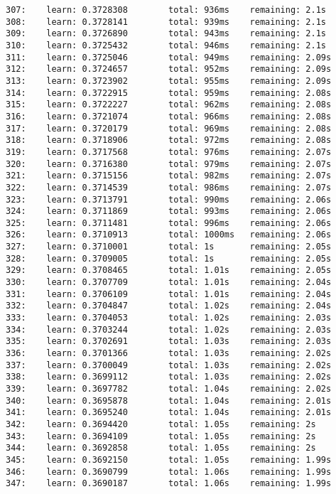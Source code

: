 \documentclass[11pt]{article}
\begin{document}
\begin{Verbatim}[commandchars=\\\{\}]
307:    learn: 0.3728308        total: 936ms    remaining: 2.1s
308:    learn: 0.3728141        total: 939ms    remaining: 2.1s
309:    learn: 0.3726890        total: 943ms    remaining: 2.1s
310:    learn: 0.3725432        total: 946ms    remaining: 2.1s
311:    learn: 0.3725046        total: 949ms    remaining: 2.09s
312:    learn: 0.3724657        total: 952ms    remaining: 2.09s
313:    learn: 0.3723902        total: 955ms    remaining: 2.09s
314:    learn: 0.3722915        total: 959ms    remaining: 2.08s
315:    learn: 0.3722227        total: 962ms    remaining: 2.08s
316:    learn: 0.3721074        total: 966ms    remaining: 2.08s
317:    learn: 0.3720179        total: 969ms    remaining: 2.08s
318:    learn: 0.3718906        total: 972ms    remaining: 2.08s
319:    learn: 0.3717568        total: 976ms    remaining: 2.07s
320:    learn: 0.3716380        total: 979ms    remaining: 2.07s
321:    learn: 0.3715156        total: 982ms    remaining: 2.07s
322:    learn: 0.3714539        total: 986ms    remaining: 2.07s
323:    learn: 0.3713791        total: 990ms    remaining: 2.06s
324:    learn: 0.3711869        total: 993ms    remaining: 2.06s
325:    learn: 0.3711481        total: 996ms    remaining: 2.06s
326:    learn: 0.3710913        total: 1000ms   remaining: 2.06s
327:    learn: 0.3710001        total: 1s       remaining: 2.05s
328:    learn: 0.3709005        total: 1s       remaining: 2.05s
329:    learn: 0.3708465        total: 1.01s    remaining: 2.05s
330:    learn: 0.3707709        total: 1.01s    remaining: 2.04s
331:    learn: 0.3706109        total: 1.01s    remaining: 2.04s
332:    learn: 0.3704847        total: 1.02s    remaining: 2.04s
333:    learn: 0.3704053        total: 1.02s    remaining: 2.03s
334:    learn: 0.3703244        total: 1.02s    remaining: 2.03s
335:    learn: 0.3702691        total: 1.03s    remaining: 2.03s
336:    learn: 0.3701366        total: 1.03s    remaining: 2.02s
337:    learn: 0.3700049        total: 1.03s    remaining: 2.02s
338:    learn: 0.3699112        total: 1.03s    remaining: 2.02s
339:    learn: 0.3697782        total: 1.04s    remaining: 2.02s
340:    learn: 0.3695878        total: 1.04s    remaining: 2.01s
341:    learn: 0.3695240        total: 1.04s    remaining: 2.01s
342:    learn: 0.3694420        total: 1.05s    remaining: 2s
343:    learn: 0.3694109        total: 1.05s    remaining: 2s
344:    learn: 0.3692858        total: 1.05s    remaining: 2s
345:    learn: 0.3692150        total: 1.05s    remaining: 1.99s
346:    learn: 0.3690799        total: 1.06s    remaining: 1.99s
347:    learn: 0.3690187        total: 1.06s    remaining: 1.99s

\end{Verbatim}
\end{document}
